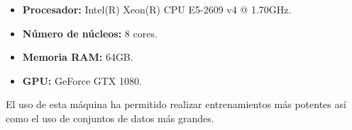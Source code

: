 \begin{itemize}
    \item \textbf{Procesador:} Intel(R) Xeon(R) CPU E5-2609 v4 @ 1.70GHz.
    \item \textbf{Número de núcleos:} 8 cores.
    \item \textbf{Memoria RAM:} 64GB.
    \item \textbf{GPU:} GeForce GTX 1080.
\end{itemize}

El uso de esta máquina ha permitido realizar entrenamientos más potentes así como el uso de conjuntos de datos más grandes.